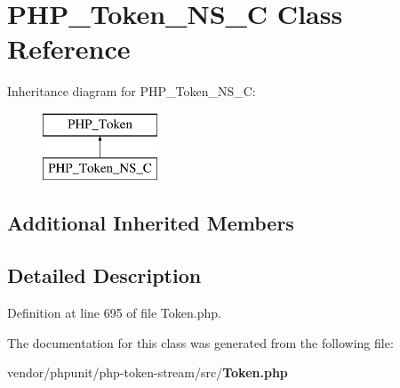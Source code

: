 \section{P\+H\+P\+\_\+\+Token\+\_\+\+N\+S\+\_\+\+C Class Reference}
\label{class_p_h_p___token___n_s___c}
Inheritance diagram for P\+H\+P\+\_\+\+Token\+\_\+\+N\+S\+\_\+\+C\+:\begin{figure}[H]
\begin{center}
\leavevmode
\includegraphics[height=2.000000cm]{class_p_h_p___token___n_s___c}
\end{center}
\end{figure}
\subsection*{Additional Inherited Members}


\subsection{Detailed Description}


Definition at line 695 of file Token.\+php.



The documentation for this class was generated from the following file\+:\begin{DoxyCompactItemize}
\item 
vendor/phpunit/php-\/token-\/stream/src/{\bf Token.\+php}\end{DoxyCompactItemize}
